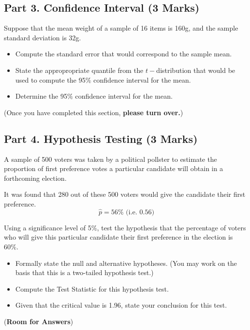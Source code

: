 \newpage
\subsection*{Part 3. Confidence Interval (3 Marks)}

Suppose that the mean weight of a sample of 16 items is 160g, and the sample standard deviation is 32g.



\begin{itemize}
\item  Compute the standard error that would correspond to the sample mean.
\item  State the appropropriate quantile from the $t-$distribution that would be used to compute the 95\% confidence interval for the mean.
\item  Determine the 95\% confidence interval for the mean.
\end{itemize}
(Once you have completed this section, \textbf{please turn over.})
\newpage
\subsection*{Part 4. Hypothesis Testing (3 Marks)}

\noindent A sample of 500 voters was taken by a political pollster to estimate the proportion of first preference votes a particular candidate will obtain in a forthcoming election. \\
\bigskip

\noindent It was found that 280 out of these 500 voters would give the candidate their first preference.
\[\hat{p} = 56\%  \mbox{    (i.e.  } 0.56)\]

\vspace{0.4cm}
\noindent
Using a significance level of 5\%, test the hypothesis that the percentage of voters who will give this particular candidate their first preference in the election is 60\%.\\


\begin{itemize}
\item  Formally state the null and alternative hypotheses. (You may work on the basis that this is a two-tailed hypothesis test.)

\item  Compute the Test Statistic for this hypothesis test.
\item  Given that the critical value is 1.96, state your conclusion for this test.
\end{itemize}
\newpage
(\textbf{Room for Answers})
\newpage


